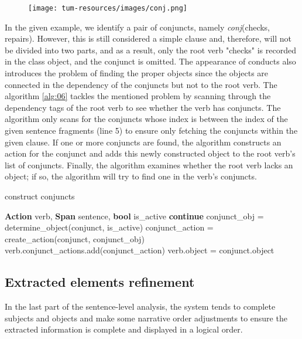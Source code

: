 \begin{figure}[h]
    \centering
    \texttt{[image: tum-resources/images/conj.png]}
\end{figure}

In the given example, we identify a pair of conjuncts, namely \textit{conj}(checks, repairs). However, this is still considered a simple clause and, therefore, will not be divided into two parts, and as a result, only the root verb "checks" is recorded in the class object, and the conjunct is omitted. The appearance of conducts also introduces the problem of finding the proper objects since the objects are connected in the dependency of the conjuncts but not to the root verb. The algorithm \ref{alg:06} tackles the mentioned problem by scanning through the dependency tags of the root verb to see whether the verb has conjuncts. The algorithm only scans for the conjuncts whose index is between the index of the given sentence fragments (line 5) to ensure only fetching the conjuncts within the given clause. If one or more conjuncts are found, the algorithm constructs an action for the conjunct and adds this newly constructed object to the root verb's list of conjuncts. Finally, the algorithm examines whether the root verb lacks an object; if so, the algorithm will try to find one in the verb's conjuncts.

\begin{algorithm}
\caption{construct conjuncts}
\label{alg:06}
	\begin{algorithmic} [1]
		\REQUIRE \textbf{Action} verb, \textbf{Span} sentence, \textbf{bool} is\_active
		\STATE \textbf{continue}
		\ENDIF 
		\STATE conjunct\_obj = determine\_object(conjunct, is\_active)
		\STATE conjunct\_action = create\_action(conjunct, conjunct\_obj)
		\STATE verb.conjunct\_actions.add(conjunct\_action)
		\ENDIF 
		\ENDFOR
		\STATE verb.object = conjunct.object
		\ENDIF
		\ENDFOR
		\end{algorithmic}
\end{algorithm}

\subsection{Extracted elements refinement}
In the last part of the sentence-level analysis, the system tends to complete subjects and objects and make some narrative order adjustments to ensure the extracted information is complete and displayed in a logical order.

